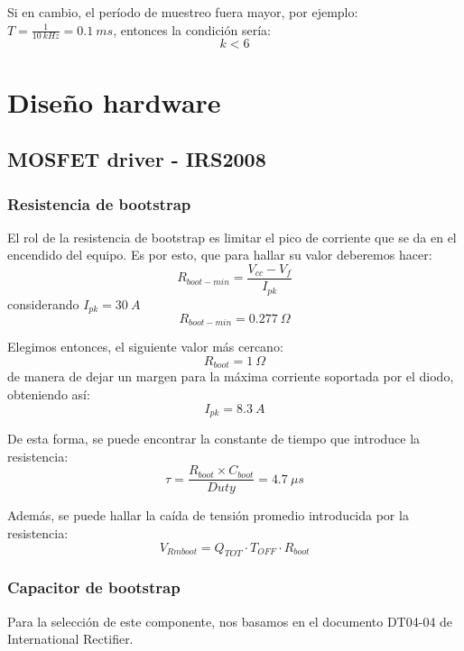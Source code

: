 \documentclass[titlepage, 12pt]{article}
\begin{document}
Si en cambio, el período de muestreo fuera mayor, por ejemplo: $T = \frac{1}{\SI{10}{kHz}} = \SI{0.1}{ms}$, entonces la condición sería:
\begin{equation}
\label{eq:k_real_10khz}
    k < 6
\end{equation}

\section{Diseño hardware}
\subsection{MOSFET driver - IRS2008}
\subsubsection{Resistencia de bootstrap}
El rol de la resistencia de bootstrap es limitar el pico de corriente que se da en el encendido del equipo. Es por esto, que para hallar su valor deberemos hacer:
\[
    R_{boot-min} = \frac{V_{cc} - V_f}{I_{pk}}
\]
considerando $I_{pk} = \SI{30}{A}$
\[
    R_{boot-min} = \SI{0.277}{\Omega}
\]

Elegimos entonces, el siguiente valor más cercano:
\[
    R_{boot} = \SI{1}{\Omega}
\]
de manera de dejar un margen para la máxima corriente soportada por el diodo, obteniendo así:
\[
    I_{pk} = \SI{8.3}{A}
\]

De esta forma, se puede encontrar la constante de tiempo que introduce la resistencia:
\[
    \tau = \frac{R_{boot} \times C_{boot}}{Duty} = \SI{4.7}{\mu s}
\]

Además, se puede hallar la caída de tensión promedio introducida por la resistencia:
\[
    V_{Rmboot} = Q_{TOT} \cdot T_{OFF} \cdot R_{boot}
\]

\subsubsection{Capacitor de bootstrap}
Para la selección de este componente, nos basamos en el documento DT04-04 de International Rectifier.
\end{document}
